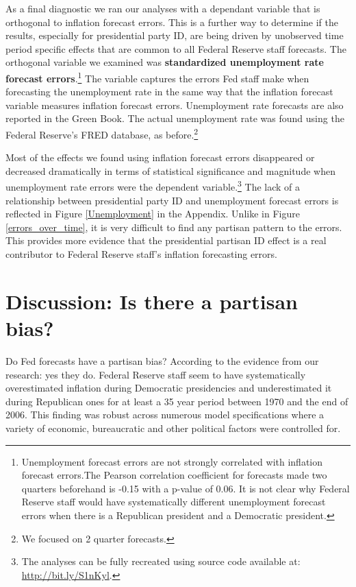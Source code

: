 \documentclass[a4paper]{article}\usepackage{graphicx, color}
\begin{document}
As a final diagnostic we ran our analyses with a dependant variable that is orthogonal to inflation forecast errors. This is a further way to determine if the results, especially for presidential party ID, are being driven by unobserved time period specific effects that are common to all Federal Reserve staff forecasts. The orthogonal variable we examined was {\bf{standardized unemployment rate forecast errors}}.\footnote{Unemployment forecast errors are not strongly correlated with inflation forecast errors.The Pearson correlation coefficient for forecasts made two quarters beforehand is -0.15 with a p-value of 0.06. It is not clear why Federal Reserve staff would have systematically different unemployment forecast errors when there is a Republican president and a Democratic president.} The variable captures the errors Fed staff make when forecasting the unemployment rate in the same way that the inflation forecast variable measures inflation forecast errors. Unemployment rate forecasts are also reported in the Green Book. The actual unemployment rate was found using the Federal Reserve's FRED database, as before.\footnote{We focused on 2 quarter forecasts.}

Most of the effects we found using inflation forecast errors disappeared or decreased dramatically in terms of statistical significance and magnitude when unemployment rate errors were the dependent variable.\footnote{The analyses can be fully recreated using source code available at: \url{http://bit.ly/S1nKyl}.} The lack of a relationship between presidential party ID and unemployment forecast errors is reflected in Figure \ref{Unemployment} in the Appendix. Unlike in Figure \ref{errors_over_time}, it is very difficult to find any partisan pattern to the errors. This provides more evidence that the presidential partisan ID effect is a real contributor to Federal Reserve staff's inflation forecasting errors.

\section*{Discussion: Is there a partisan bias?}

Do Fed forecasts have a partisan bias? According to the evidence from our research: yes they do. Federal Reserve staff seem to have systematically overestimated inflation during Democratic presidencies and underestimated it during Republican ones for at least a 35 year period between 1970 and the end of 2006. This finding was robust across numerous model specifications where a variety of economic, bureaucratic and other political factors were controlled for. 
\end{document}
